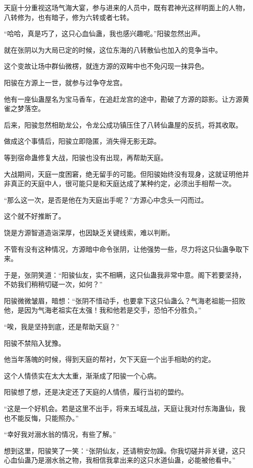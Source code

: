\begin{this_body}
天庭十分重视这场气海大宴，参与进来的人员中，既有君神光这样明面上的人物，八转修为，也有暗子，修为六转或者七转。

“哈哈，真是巧了，这只心血仙蛊，我也感兴趣呢。”阳骏忽然出声。

就在张阴以为大局已定的时候，这位东海的八转散仙也加入的竞争当中。

这个变故让场中群仙微楞，就连方源的双眸中也不免闪现一抹异色。

阳骏在方源上一世，就参与过争夺龙宫。

他有一座仙蛊屋名为宝马香车，在追赶龙宫的途中，勘破了方源的踪影。让方源黄雀之梦落空。

后来，阳骏忽然相助龙公，令龙公成功镇压住了八转仙蛊屋的反抗，将其收取。

做成这个事情后，阳骏立即隐匿，消失得无影无踪。

等到宿命蛊修复大战，阳骏也没有出现，再帮助天庭。

大战期间，天庭一度困窘，绝无留手的可能。但阳骏始终没有现身，这就证明他并非真正的天庭中人，很可能只是和天庭达成了某种约定，必须出手相帮一次。

“那么这一次，是否是他在为天庭出手呢？”方源心中念头一闪而过。

这个就不好推断了。

饶是方源智道造诣深厚，也因缺乏关键线索，难以判断。

不管有没有这种情况，方源暗中命令张阴，让他强势一些，尽力将这只仙蛊争取下来。

于是，张阴笑道：“阳骏仙友，实不相瞒，这只仙蛊我非常中意。阁下若要坚持，不妨我们稍稍切磋一次，如何？”

阳骏微微皱眉，暗想：“张阴不惜动手，也要拿下这只仙蛊么？气海老祖能一招败他，是因为气海老祖实在太强！我和他若是交手，恐怕不分胜负。”

“唉，我是坚持到底，还是帮助天庭？”

阳骏不禁陷入犹豫。

他当年落魄的时候，得到天庭的帮衬，欠下天庭一个出手相助的约定。

这个人情债实在太大太重，渐渐成了阳骏一个心病。

阳骏想了想，还是决定还了天庭的人情债，履行当初的盟约。

“这是一个好机会。若是这里不出手，将来五域乱战，天庭让我对付东海蛊仙，我也不能反悔，只能照办。”

“幸好我对溺水翁的情况，有些了解。”

想到这里，阳骏笑了一笑：“张阴仙友，还请稍安勿躁。你我切磋并非关键，这只心血仙蛊乃是溺水翁之物，我相信我拿出来的这只水道仙蛊，必能被他看中。”


\end{this_body}
